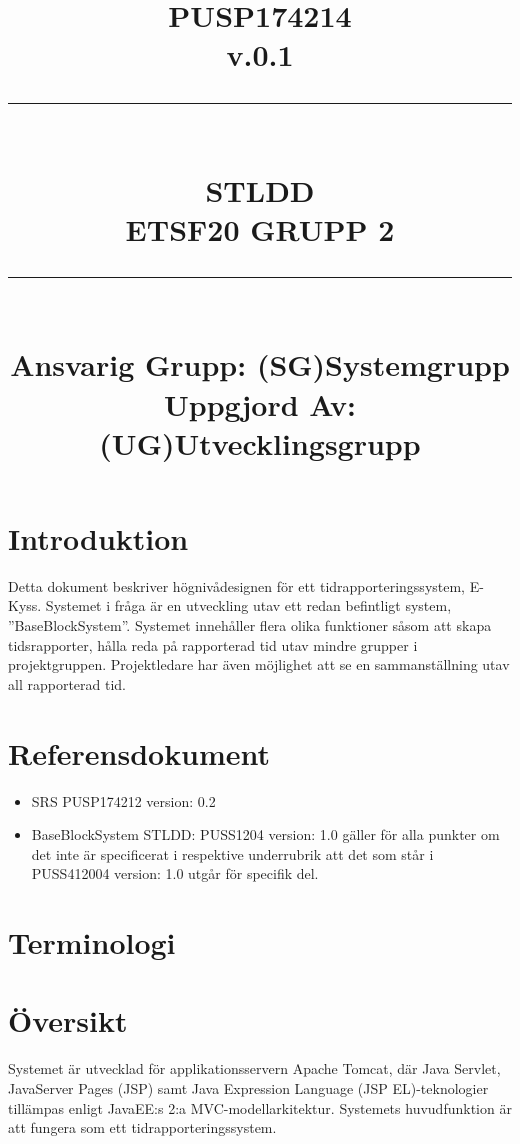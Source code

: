 \documentclass[paper=a4, fontsize=11pt,twoside]{article}
\title{
		\documentNumber{#1}																		
		\documentVersion{#2}																			
		\HRule{0.5pt} \\ %
		\LARGE \textbf{\uppercase{#3}} \\
		\large \textbf{\uppercase{ETSF20 Grupp 2}} 
		\HRule{2pt} \\ [1.5cm]    
		\normalsize            
		\documentResponsible{#4} \\ 
		\documentCreator{#5}  
	}
\newcommand{\HRule}[1]{\rule{\linewidth}{#1}}
\newcommand{\documentNumber}[1]{\centering PUSP1742#1 \\[1.0cm]}
\newcommand{\documentVersion}[1]{\centering \small{v.#1} \\[1.0cm]}
\newcommand{\documentResponsible}[1]{\centering  Ansvarig Grupp: #1}
\newcommand{\documentCreator}[1]{\centering Uppgjord Av: #1}
\newcommand{\grouptitlepage}[5]{ 
	\title{
		\documentNumber{#1}																		
		\documentVersion{#2}																			
		\HRule{0.5pt} \\ %
		\LARGE \textbf{\uppercase{#3}} \\
		\large \textbf{\uppercase{ETSF20 Grupp 2}} 
		\HRule{2pt} \\ [1.5cm]    
		\normalsize            
		\documentResponsible{#4} \\ 
		\documentCreator{#5}  
	}																							
	\maketitle																					
	\thispagestyle{empty} 																		
	\newpage 
}
\begin{document}
\grouptitlepage
{14}
{0.1}
{STLDD}
{(SG)Systemgrupp}
{(UG)Utvecklingsgrupp}
\tableofcontents

\section{Introduktion}
Detta dokument beskriver högnivådesignen för ett tidrapporteringssystem, E-Kyss. Systemet i fråga är en utveckling utav ett redan befintligt system, ''BaseBlockSystem''. Systemet innehåller flera olika funktioner såsom att skapa tidsrapporter, hålla reda på rapporterad tid utav mindre grupper i projektgruppen. Projektledare har även möjlighet att se en sammanställning utav all rapporterad tid. 

\section{Referensdokument}
\begin{itemize}
\item SRS PUSP174212 version: 0.2
\item BaseBlockSystem STLDD: PUSS1204 version: 1.0 gäller för alla punkter om det inte är specificerat i respektive underrubrik att det som står i PUSS412004 version: 1.0 utgår för specifik del.
\end{itemize}
\section{Terminologi}

\newpage
\section{Översikt}
Systemet är utvecklad för applikationsservern Apache Tomcat, där Java Servlet, JavaServer Pages (JSP) samt Java Expression Language (JSP EL)-teknologier tillämpas enligt JavaEE:s 2:a MVC-modellarkitektur. Systemets huvudfunktion är att fungera som ett tidrapporteringssystem.
\end{document}
